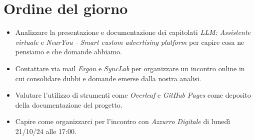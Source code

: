 \section{Ordine del giorno}

\begin{itemize}
    \item Analizzare la presentazione e documentazione dei capitolati \emph{LLM: Assistente virtuale} e \emph{NearYou - Smart custom advertising platform} per capire cosa ne pensiamo e che domande abbiamo.
    \item Contattare via mail \emph{Ergon} e \emph{SyncLab} per organizzare un incontro online in cui consolidare dubbi e domande emerse dalla nostra analisi.
    \item Valutare l'utilizzo di strumenti come \emph{Overleaf} e \emph{GitHub Pages} come deposito della documentazione del progetto.
    \item Capire come organizzarci per l'incontro con \emph{Azzurro Digitale} di lunedì 21/10/24 alle 17:00.
\end{itemize}